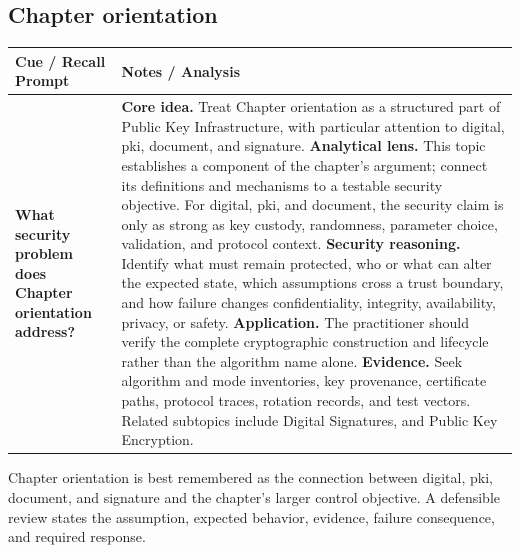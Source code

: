 \documentclass[11pt]{article}
\newcommand{\CornellHeader}{%
\rowcolor{Navy}\color{white}\bfseries Cue / Recall Prompt & \color{white}\bfseries Notes / Analysis\\\hline}
\newcommand{\CornellRow}[2]{%
\cellcolor{CueGray}\RaggedRight\textbf{#1} & \RaggedRight #2\\\hline}
\begin{document}
\subsection*{Chapter orientation}
\begin{longtable}{>{\RaggedRight\arraybackslash}p{}|>{\RaggedRight\arraybackslash}p{}}
\CornellHeader
\CornellRow{What security problem does Chapter orientation address?}{\textbf{Core idea.} Treat Chapter orientation as a structured part of Public Key Infrastructure, with particular attention to digital, pki, document, and signature. \textbf{Analytical lens.} This topic establishes a component of the chapter's argument; connect its definitions and mechanisms to a testable security objective. For digital, pki, and document, the security claim is only as strong as key custody, randomness, parameter choice, validation, and protocol context. \textbf{Security reasoning.} Identify what must remain protected, who or what can alter the expected state, which assumptions cross a trust boundary, and how failure changes confidentiality, integrity, availability, privacy, or safety. \textbf{Application.} The practitioner should verify the complete cryptographic construction and lifecycle rather than the algorithm name alone. \textbf{Evidence.} Seek algorithm and mode inventories, key provenance, certificate paths, protocol traces, rotation records, and test vectors. Related subtopics include Digital Signatures, and Public Key Encryption.}
\end{longtable}
\begin{topicsummary}
Chapter orientation is best remembered as the connection between digital, pki, document, and signature and the chapter's larger control objective. A defensible review states the assumption, expected behavior, evidence, failure consequence, and required response.
\end{topicsummary}
\end{document}
